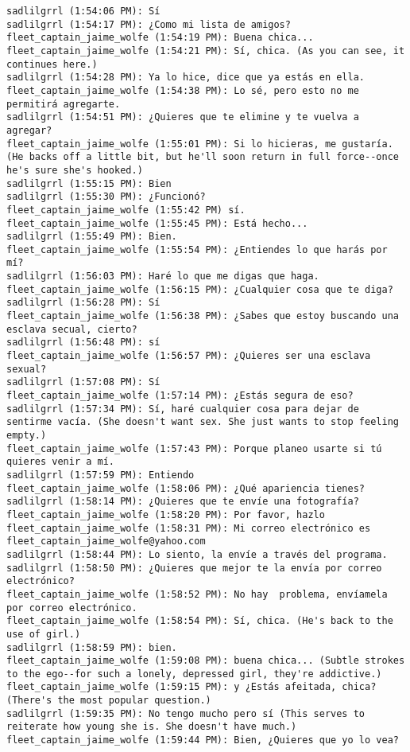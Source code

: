 \begin{verbatim}
sadlilgrrl (1:54:06 PM): Sí
sadlilgrrl (1:54:17 PM): ¿Como mi lista de amigos?
fleet_captain_jaime_wolfe (1:54:19 PM): Buena chica...
fleet_captain_jaime_wolfe (1:54:21 PM): Sí, chica. (As you can see, it continues here.)
sadlilgrrl (1:54:28 PM): Ya lo hice, dice que ya estás en ella.
fleet_captain_jaime_wolfe (1:54:38 PM): Lo sé, pero esto no me permitirá agregarte.
sadlilgrrl (1:54:51 PM): ¿Quieres que te elimine y te vuelva a agregar?
fleet_captain_jaime_wolfe (1:55:01 PM): Si lo hicieras, me gustaría. (He backs off a little bit, but he'll soon return in full force--once he's sure she's hooked.)
sadlilgrrl (1:55:15 PM): Bien
sadlilgrrl (1:55:30 PM): ¿Funcionó?
fleet_captain_jaime_wolfe (1:55:42 PM) sí.
fleet_captain_jaime_wolfe (1:55:45 PM): Está hecho...
sadlilgrrl (1:55:49 PM): Bien.
fleet_captain_jaime_wolfe (1:55:54 PM): ¿Entiendes lo que harás por mí?
sadlilgrrl (1:56:03 PM): Haré lo que me digas que haga.
fleet_captain_jaime_wolfe (1:56:15 PM): ¿Cualquier cosa que te diga?
sadlilgrrl (1:56:28 PM): Sí
fleet_captain_jaime_wolfe (1:56:38 PM): ¿Sabes que estoy buscando una esclava secual, cierto?
sadlilgrrl (1:56:48 PM): sí
fleet_captain_jaime_wolfe (1:56:57 PM): ¿Quieres ser una esclava sexual?
sadlilgrrl (1:57:08 PM): Sí
fleet_captain_jaime_wolfe (1:57:14 PM): ¿Estás segura de eso?
sadlilgrrl (1:57:34 PM): Sí, haré cualquier cosa para dejar de sentirme vacía. (She doesn't want sex. She just wants to stop feeling empty.)
fleet_captain_jaime_wolfe (1:57:43 PM): Porque planeo usarte si tú quieres venir a mí.
sadlilgrrl (1:57:59 PM): Entiendo
fleet_captain_jaime_wolfe (1:58:06 PM): ¿Qué apariencia tienes?
sadlilgrrl (1:58:14 PM): ¿Quieres que te envíe una fotografía?
fleet_captain_jaime_wolfe (1:58:20 PM): Por favor, hazlo
fleet_captain_jaime_wolfe (1:58:31 PM): Mi correo electrónico es fleet_captain_jaime_wolfe@yahoo.com
sadlilgrrl (1:58:44 PM): Lo siento, la envíe a través del programa.
sadlilgrrl (1:58:50 PM): ¿Quieres que mejor te la envía por correo electrónico?
fleet_captain_jaime_wolfe (1:58:52 PM): No hay  problema, envíamela por correo electrónico.
fleet_captain_jaime_wolfe (1:58:54 PM): Sí, chica. (He's back to the use of girl.)
sadlilgrrl (1:58:59 PM): bien.
fleet_captain_jaime_wolfe (1:59:08 PM): buena chica... (Subtle strokes to the ego--for such a lonely, depressed girl, they're addictive.)
fleet_captain_jaime_wolfe (1:59:15 PM): y ¿Estás afeitada, chica? (There's the most popular question.)
sadlilgrrl (1:59:35 PM): No tengo mucho pero sí (This serves to reiterate how young she is. She doesn't have much.)
fleet_captain_jaime_wolfe (1:59:44 PM): Bien, ¿Quieres que yo lo vea?

\end{verbatim}
